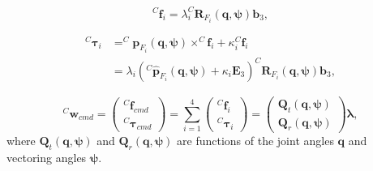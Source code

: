 \begin{equation}
\label{eq:allocation for force hydrus}
    {^C\!\boldsymbol{f}_i}=\lambda_i^C\!\boldsymbol{R}_{F_i}(\boldsymbol{q},\boldsymbol{\psi})\boldsymbol{b}_3,
\end{equation}

\begin{equation}
\begin{aligned}
\label{eq:allocation for torque hydrus}
    {^C\!\boldsymbol{\tau}_i}&=^C\!\!\boldsymbol{p}_{F_i}(\boldsymbol{q},\boldsymbol{\psi})\times^C\!\!\boldsymbol{f}_i+\kappa_i ^C\!\boldsymbol{f}_i\\
    &=\lambda_i(^{C}\boldsymbol{\hat{p}}_{F_i}(\boldsymbol{q},\boldsymbol{\psi})+\kappa_i\boldsymbol{E}_3)^C\!\boldsymbol{R}_{F_i}(\boldsymbol{q},\boldsymbol{\psi})\boldsymbol{b}_3,
\end{aligned}
\end{equation}

\begin{equation}
\label{eq:allocation for wrench hydrus}
^C\!\boldsymbol{w}_{cmd}
=
\begin{pmatrix}
^C\!\boldsymbol{f}_{cmd} \\
^C\!\boldsymbol{\tau}_{cmd}
\end{pmatrix}
=
\sum_{i=1}^{4}
\begin{pmatrix}
^C\!\boldsymbol{f}_i \\
^C\!\boldsymbol{\tau}_i
\end{pmatrix} 
=\begin{pmatrix}
\boldsymbol{Q}_t(\boldsymbol{q},\boldsymbol{\psi}) \\
\boldsymbol{Q}_r(\boldsymbol{q},\boldsymbol{\psi})
\end{pmatrix}\boldsymbol{\lambda},
\end{equation}
where $\boldsymbol{Q}_t(\boldsymbol{q},\boldsymbol{\psi}) $ and $\boldsymbol{Q}_r(\boldsymbol{q},\boldsymbol{\psi})$ are functions of the joint angles $\boldsymbol q$ and vectoring angles $\boldsymbol\psi$.



